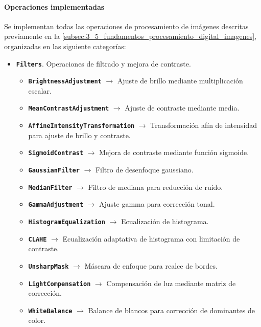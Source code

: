 \paragraph{Operaciones implementadas} \label{par:7_3_3_3_operaciones_implementadas}
Se implementan todas las operaciones de procesamiento de imágenes descritas previamente en la 
\autoref{subsec:3_5_fundamentos_procesamiento_digital_imagenes}, organizadas en las siguiente 
categorías:

\begin{itemize}[noitemsep]
    \item \texttt{\textbf{Filters}}. Operaciones de filtrado y mejora de contraste.
    \begin{itemize}[noitemsep]
        \item \texttt{\textbf{BrightnessAdjustment}} $\rightarrow$ Ajuste de brillo mediante multiplicación escalar.
        \item \texttt{\textbf{MeanContrastAdjustment}} $\rightarrow$ Ajuste de contraste mediante media.
        \item \texttt{\textbf{AffineIntensityTransformation}} $\rightarrow$ Transformación afín de intensidad para ajuste de brillo y contraste.
        \item \texttt{\textbf{SigmoidContrast}} $\rightarrow$ Mejora de contraste mediante función sigmoide.
        \item \texttt{\textbf{GaussianFilter}} $\rightarrow$ Filtro de desenfoque gaussiano.
        \item \texttt{\textbf{MedianFilter}} $\rightarrow$ Filtro de mediana para reducción de ruido.
        \item \texttt{\textbf{GammaAdjustment}} $\rightarrow$ Ajuste gamma para corrección tonal.
        \item \texttt{\textbf{HistogramEqualization}} $\rightarrow$ Ecualización de histograma.
        \item \texttt{\textbf{CLAHE}} $\rightarrow$ Ecualización adaptativa de histograma con limitación de contraste.
        \item \texttt{\textbf{UnsharpMask}} $\rightarrow$ Máscara de enfoque para realce de bordes.
        \item \texttt{\textbf{LightCompensation}} $\rightarrow$ Compensación de luz mediante matriz de corrección.
        \item \texttt{\textbf{WhiteBalance}} $\rightarrow$ Balance de blancos para corrección de dominantes de color.
    \end{itemize}

\end{itemize}
